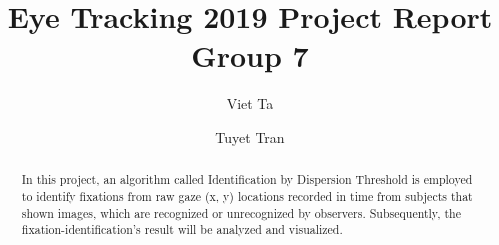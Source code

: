 \documentclass[sigchi-a]{acmart}
\begin{document}
\title{Eye Tracking 2019 Project Report Group 7}

\author{Viet Ta}

\author{Tuyet Tran}

\renewcommand{\shortauthors}{Viet and Tuyet, et al.}

\begin{abstract}
In this project, an algorithm called Identification by Dispersion Threshold is employed to identify fixations from raw gaze (x, y) locations recorded in time from subjects that shown images, which are recognized or unrecognized by observers. Subsequently, the fixation-identification's result will be analyzed and visualized. 
\end{abstract}


\end{document}
